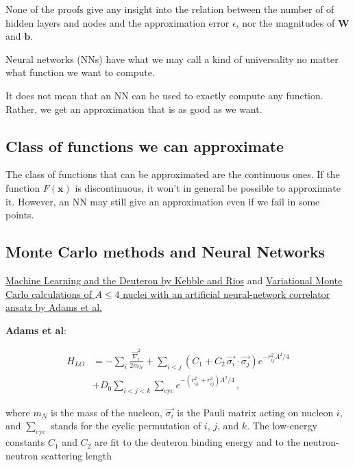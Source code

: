 \documentclass[%
oneside,                 %
final,                   %
10pt]{article}
\begin{document}
None of the proofs give any insight into the relation between the
number of of hidden layers and nodes and the approximation error
$\epsilon$, nor the magnitudes of $\bm{W}$ and $\bm{b}$.

Neural networks (NNs) have what we may call a kind of universality no matter what function we want to compute.

\begin{block}{}
It does not mean that an NN can be used to exactly compute any function. Rather, we get an approximation that is as good as we want. 
\end{block}

\subsection{Class of functions we can approximate}

\begin{block}{}
The class of functions that can be approximated are the continuous ones.
If the function $F(\bm{x})$ is discontinuous, it won't in general be possible to approximate it. However, an NN may still give an approximation even if we fail in some points.
\end{block}

\subsection{Monte Carlo methods and Neural Networks}

\href{{https://www.sciencedirect.com/science/article/pii/S0370269320305463?via%3Dihub}}{Machine Learning and the Deuteron by Kebble and Rios} and
\href{{https://journals.aps.org/prl/abstract/10.1103/PhysRevLett.127.022502}}{Variational Monte Carlo calculations of $A\le 4$ nuclei with an artificial neural-network correlator ansatz by Adams et al.}

\textbf{Adams et al}:

\begin{align}
H_{LO} &=-\sum_i \frac{{\vec{\nabla}_i^2}}{2m_N}
+\sum_{i<j} {\left(C_1  + C_2\, \vec{\sigma_i}\cdot\vec{\sigma_j}\right)
e^{-r_{ij}^2\Lambda^2 / 4 }}
\nonumber\\
&+D_0 \sum_{i<j<k} \sum_{\text{cyc}}
{e^{-\left(r_{ik}^2+r_{ij}^2\right)\Lambda^2/4}}\,,
\end{align}

where $m_N$ is the mass of the nucleon, $\vec{\sigma_i}$ is the Pauli
matrix acting on nucleon $i$, and $\sum_{\text{cyc}}$ stands for the
cyclic permutation of $i$, $j$, and $k$. The low-energy constants
$C_1$ and $C_2$ are fit to the deuteron binding energy and to the
neutron-neutron scattering length
\end{document}
